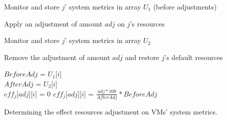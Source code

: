 \documentclass[twocolumn]{bmcart}%
\begin{document}
\begin{algorithm}[h]
\LinesNumbered
{}

{
{

      Monitor and store $j$' system metrics in array $U_{1}$ (before adjustments)

   {

      Apply an adjustment of amount $adj$ on $j$'s resources

      Monitor and store $j$' system metrics in array $U_{2}$

      Remove the adjustment of amount $adj$ and restore $j$'s default resources

   {
        $BeforeAdj$ = $U_{1}$[$i$] \\
        $AfterAdj$ = $U_{2}$[$i$] \\

        {
          $eff_{j}$[$adj$][$i$] = 0
        }
        {
          $eff_{j}$[$adj$][$i$] = $\frac{adj*100}{AfterAdj}  * BeforeAdj$
        }
   }
   }
}
}


\caption{Determining the effect resources adjustment on VMs' system metrics.}
\end{algorithm}
\end{document}
